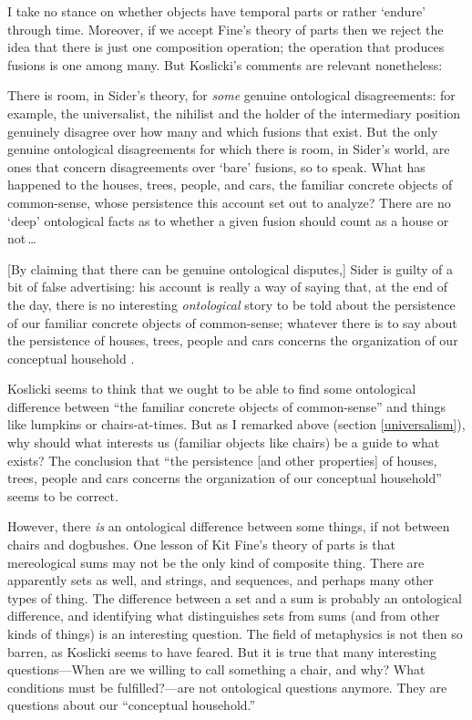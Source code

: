 \documentclass[11pt]{article}
\newenvironment{squote}{%
\begin{spacing}{1}
\begin{list}{}{%
\setlength{\labelwidth}{0pt}%
\rightmargin\leftmargin%
}
\item\relax
}{%
\end{list}%
\end{spacing}
}
\begin{document}
\begin{spacing}{1.5}
I take no stance on whether objects have temporal parts or rather
`endure' through time.  Moreover, if we accept Fine's theory of parts
then we reject the idea that there is just one composition operation;
the operation that produces fusions is one among many.  But Koslicki's
comments are relevant nonetheless:

\begin{squote}
There is room, in Sider's theory, for {\em some} genuine ontological
disagreements: for example, the universalist, the nihilist and the
holder of the intermediary position genuinely disagree over how many
and which fusions that exist.  But the only genuine ontological
disagreements for which there is room, in Sider's world, are ones that
concern disagreements over `bare' fusions, so to speak.  What has
happened to the houses, trees, people, and cars, the familiar concrete
objects of common-sense, whose persistence this account set out to
analyze?  There are no `deep' ontological facts as to whether a given
fusion should count as a house or not\,\ldots

[By claiming that there can be genuine ontological disputes,] Sider is
guilty of a bit of false advertising: his account is really a way of
saying that, at the end of the day, there is no interesting {\em
  ontological} story to be told about the persistence of our familiar
concrete objects of common-sense; whatever there is to say about the
persistence of houses, trees, people and cars concerns the
organization of our conceptual household
\citeyearpar[124--125]{koslicki2003}.
\end{squote}

Koslicki seems to think that we ought to be able to find some
ontological difference between ``the familiar concrete objects of
common-sense'' and things like lumpkins or chairs-at-times.  But as I
remarked above (section \ref{universalism}), why should what interests
us (familiar objects like chairs) be a guide to what exists?  The
conclusion that ``the persistence [and other properties] of houses,
trees, people and cars concerns the organization of our conceptual
household'' seems to be correct.

However, there {\em is} an ontological difference between some things,
if not between chairs and dogbushes.  One lesson of Kit Fine's theory
of parts is that mereological sums may not be the only kind of
composite thing.  There are apparently sets as well, and strings, and
sequences, and perhaps many other types of thing.  The difference
between a set and a sum is probably an ontological difference, and
identifying what distinguishes sets from sums (and from other kinds of
things) is an interesting question.  The field of metaphysics is not
then so barren, as Koslicki seems to have feared.  But it is true that
many interesting questions---When are we willing to call something a
chair, and why?  What conditions must be fulfilled?---are not
ontological questions anymore.  They are questions about our
``conceptual household.''

\ifstandalone
\end{spacing}


\fi
\end{document}
